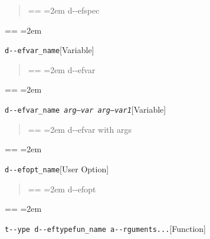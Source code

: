 \documentclass{book}
\makeatletter
\newenvironment{GNUTexinfopreformatted}{%
  \par\obeylines\obeyspaces\frenchspacing
  \parskip=\z@\parindent=\z@}{}
\makeatother
\begin{document}
%
\begin{quote}
\unskip{\parskip=0pt\noindent}%
\begin{GNUTexinfopreformatted}
\leftskip=2em\relax\ttfamily%
d{-}{-}efspec
\end{GNUTexinfopreformatted}
\end{quote}
\begin{GNUTexinfopreformatted}
\leftskip=2em\relax\ttfamily%

\end{GNUTexinfopreformatted}
\noindent\texttt{d{-}{-}efvar\_name}\hfill[Variable]



%
\begin{quote}
\unskip{\parskip=0pt\noindent}%
\begin{GNUTexinfopreformatted}
\leftskip=2em\relax\ttfamily%
d{-}{-}efvar
\end{GNUTexinfopreformatted}
\end{quote}
\begin{GNUTexinfopreformatted}
\leftskip=2em\relax\ttfamily%

\end{GNUTexinfopreformatted}
\noindent\texttt{d{-}{-}efvar\_name \EmbracOn{}\textnormal{\textsl{arg--var arg--var1}}\EmbracOff{}}\hfill[Variable]



%
\begin{quote}
\unskip{\parskip=0pt\noindent}%
\begin{GNUTexinfopreformatted}
\leftskip=2em\relax\ttfamily%
d{-}{-}efvar with args
\end{GNUTexinfopreformatted}
\end{quote}
\begin{GNUTexinfopreformatted}
\leftskip=2em\relax\ttfamily%

\end{GNUTexinfopreformatted}
\noindent\texttt{d{-}{-}efopt\_name}\hfill[User Option]



%
\begin{quote}
\unskip{\parskip=0pt\noindent}%
\begin{GNUTexinfopreformatted}
\leftskip=2em\relax\ttfamily%
d{-}{-}efopt
\end{GNUTexinfopreformatted}
\end{quote}
\begin{GNUTexinfopreformatted}
\leftskip=2em\relax\ttfamily%

\end{GNUTexinfopreformatted}
\noindent\texttt{t{-}{-}ype d{-}{-}eftypefun\_name a{-}{-}rguments...}\hfill[Function]
\end{document}
